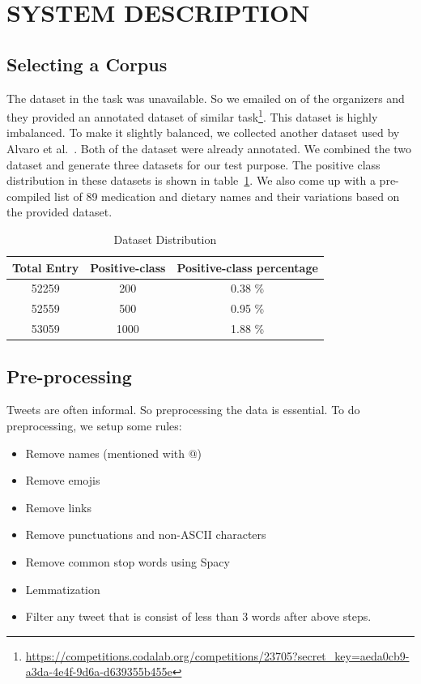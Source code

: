 \section{SYSTEM DESCRIPTION}

\subsection{Selecting a Corpus}
The dataset in the task was unavailable. So we emailed on of the organizers and they provided an annotated dataset of similar task\footnote{\url{https://competitions.codalab.org/competitions/23705?secret_key=aeda0cb9-a3da-4e4f-9d6a-d639355b455e}}. This dataset is highly imbalanced. To make it slightly balanced, we collected another dataset used by Alvaro et al.~\cite{alvaro2017twimed}. Both of the dataset were already annotated. We combined the two dataset and generate three datasets for our test purpose. The positive class distribution in these datasets is shown in table~\ref{table:2}. We also come up with a pre-compiled list of 89 medication and dietary names and their variations based on the provided dataset.

\begin{table}[h!]
	\centering
	\begin{tabular}{||c c c||} 
		\hline
		Total Entry & Positive-class & Positive-class percentage \\ [0.5ex] 
		\hline\hline
		52259 & 200 & 0.38 \% \\ 
		52559 & 500 & 0.95 \% \\
		53059 & 1000 & 1.88 \% \\
		\hline
	\end{tabular}
	\caption{Dataset Distribution}
	\label{table:2}
\end{table}

\subsection{Pre-processing}
Tweets are often informal. So preprocessing the data is essential. To do preprocessing, we setup some rules: 
\begin{itemize}
	\item Remove names (mentioned with @)
	\item Remove emojis
	\item Remove links
	\item Remove punctuations and non-ASCII characters
	\item Remove common stop words using Spacy
	\item Lemmatization
	\item Filter any tweet that is consist of less than 3 words after above steps.
\end{itemize}

